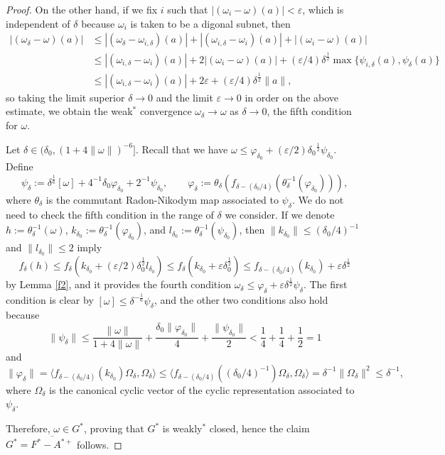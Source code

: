 \documentclass[noamsfonts,a4paper,10pt]{amsart}
\theoremstyle{plain}
\theoremstyle{definition}
\theoremstyle{remark}
\begin{document}
\begin{proof}
On the other hand, if we fix $i$ such that $|(\omega_i-\omega)(a)|<\varepsilon$, which is independent of $\delta$ because $\omega_i$ is taken to be a digonal subnet, then
\begin{align*}
|(\omega_\delta-\omega)(a)|
&\le|(\omega_\delta-\omega_{i,\delta})(a)|+|(\omega_{i,\delta}-\omega_i)(a)|+|(\omega_i-\omega)(a)|\\
&\le|(\omega_{i,\delta}-\omega_i)(a)|+2|(\omega_i-\omega)(a)|+(\varepsilon/4)\delta^\frac12\max\{\psi_{i,\delta}(a),\psi_\delta(a)\}\\
&\le|(\omega_{i,\delta}-\omega_i)(a)|+2\varepsilon+(\varepsilon/4)\delta^{\frac12}\|a\|,
\end{align*}
so taking the limit superior $\delta\to0$ and the limit $\varepsilon\to0$ in order on the above estimate, we obtain the weak$^*$ convergence $\omega_\delta\to\omega$ as $\delta\to0$, the fifth condition for $\omega$.

Let $\delta\in(\delta_0,(1+4\|\omega\|)^{-6}]$.
Recall that we have $\omega\le\varphi_{\delta_0}+(\varepsilon/2){\delta_0}^{\frac12}\psi_{\delta_0}$.
Define
\[\psi_\delta:=\delta^{\frac16}[\omega]+4^{-1}\delta_0\varphi_{\delta_0}+2^{-1}\psi_{\delta_0},\qquad\varphi_\delta:=\theta_\delta(f_{\delta-(\delta_0/4)}(\theta_\delta^{-1}(\varphi_{\delta_0}))),\]
where $\theta_\delta$ is the commutant Radon-Nikodym map associated to $\psi_\delta$.
We do not need to check the fifth condition in the range of $\delta$ we consider.
If we denote $h:=\theta_\delta^{-1}(\omega)$, $k_{\delta_0}:=\theta_\delta^{-1}(\varphi_{\delta_0})$, and $l_{\delta_0}:=\theta_\delta^{-1}(\psi_{\delta_0})$, then $\|k_{\delta_0}\|\le(\delta_0/4)^{-1}$ and $\|l_{\delta_0}\|\le2$ imply
\[f_\delta(h)\le f_\delta(k_{\delta_0}+(\varepsilon/2)\delta_0^{\frac12}l_{\delta_0})\le f_\delta(k_{\delta_0}+\varepsilon\delta_0^{\frac12})\le f_{\delta-(\delta_0/4)}(k_{\delta_0})+\varepsilon\delta^\frac12\]
by Lemma \ref{f2}, and it provides the fourth condition $\omega_\delta\le\varphi_\delta+\varepsilon\delta^{\frac12}\psi_\delta$.
The first condition is clear by $[\omega]\le\delta^{-\frac16}\psi_\delta$, and the other two conditions also hold because
\[\|\psi_\delta\|\le\frac{\|\omega\|}{1+4\|\omega\|}+\frac{\delta_0\|\varphi_{\delta_0}\|}4+\frac{\|\psi_{\delta_0}\|}2<\frac14+\frac14+\frac12=1\]
and
\[\|\varphi_\delta\|=\langle f_{\delta-(\delta_0/4)}(k_{\delta_0})\Omega_\delta,\Omega_\delta\rangle\le\langle f_{\delta-(\delta_0/4)}((\delta_0/4)^{-1})\Omega_\delta,\Omega_\delta\rangle=\delta^{-1}\|\Omega_\delta\|^2\le\delta^{-1},\]
where $\Omega_\delta$ is the canonical cyclic vector of the cyclic representation associated to $\psi_\delta$.

Therefore, $\omega\in G^*$, proving that $G^*$ is weakly$^*$ closed, hence the claim $G^*=\overline{F^*-A^{*+}}$ follows.
\end{proof}
\end{document}

